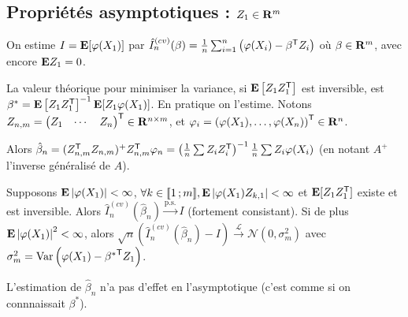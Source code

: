 


\subsection{Propriétés asymptotiques : $Z_1 \in \mathbf{R}^m$}

	On estime $I = \mathbf{E}[\varphi(X_1)]$ par $\hat{I}_n^{(cv)}(\beta) = \frac{1}{n} \sum_{i = 1}^n \left( \varphi(X_i) - \beta^\mathsf{T}Z_i \right)$ où $\beta \in \mathbf{R}^m$, avec encore $\mathbf{E} Z_1 = 0$.

	La valeur théorique pour minimiser la variance, si $\mathbf{E} \left[ Z_1 Z_1^\mathsf{T} \right]$ est inversible, est $\beta^* = \mathbf{E} \left[ Z_1 Z_1^\mathsf{T} \right]^{-1} \mathbf{E}[Z_1 \varphi(X_1)]$.
	En pratique on l'estime.
	Notons $Z_{n,m} = \begin{pmatrix} Z_1 & \cdots & Z_n \end{pmatrix}^\mathsf{T} \in \mathbf{R}^{n \times m}$, et $\mathbf{\varphi}_i = \left(\varphi(X_1), \ldots, \varphi(X_n) \right)^\mathsf{T} \in \mathbf{R}^n$.
	
	Alors $\hat{\beta}_n = (Z_{n,m}^\mathsf{T} Z_{n,m})^{+} Z_{n,m}^\mathsf{T} \varphi_n = \left( \frac{1}{n} \sum Z_i Z_i^\mathsf{T} \right)^{-1} \frac{1}{n} \sum Z_i \varphi(X_i)$ (en notant $A^+$ l'inverse généralisé de $A$).
	
	\begin{pop}
		Supposons $\mathbf{E} \left\lvert\varphi(X_1)\right\rvert < \infty$, $\forall k \in \mathopen{[\![}1\mathclose{}\mathpunct{};m\mathclose{]\!]}, \mathbf{E} \left\lvert\varphi(X_1) Z_{k,1}\right\rvert < \infty$ et $\mathbf{E}[Z_1 Z_1^\mathsf{T}]$ existe et est inversible.
		Alors $\hat{I}_n^{(cv)}(\hat{\beta}_n) \overset{\text{p.s.}}{\longrightarrow} I$ (fortement consistant).
		Si de plus $\mathbf{E} \left\lvert\varphi(X_1)\right\rvert^2 < \infty$, alors $\sqrt{n} \left( \hat{I}_n^{(cv)}(\hat{\beta}_n) - I \right) \overset{\mathcal{L}}{\longrightarrow} \mathcal{N}(0,\sigma_m^2)$ avec $\sigma_m^2 = \operatorname{Var} \left( \varphi(X_1) - {\beta^*}^\mathsf{T} Z_1 \right)$.
	\end{pop}
	
	\begin{rem}
		L'estimation de $\hat{\beta}_n$ n'a pas d'effet en l'asymptotique (c'est comme si on connnaissait $\beta^*$).
	\end{rem}
	
